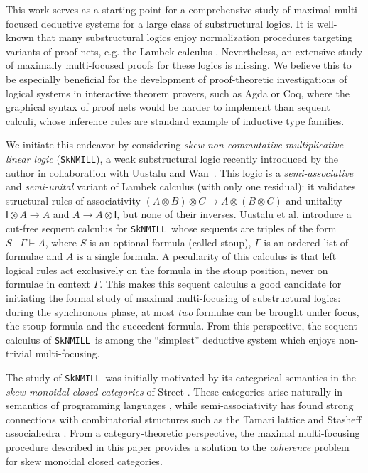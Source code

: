 \documentclass[runningheads]{llncs}
\newcommand{\ot}{\otimes}
\newcommand{\I}{\mathsf{I}}
\newcommand{\SkNMILL}{\texttt{SkNMILL}}
\begin{document}
This work serves as a starting point for a comprehensive study of maximal multi-focused deductive systems for a large class of substructural logics. It is well-known that many substructural logics enjoy normalization procedures targeting variants of proof nets, e.g. the Lambek calculus \cite{LR:pronlc}. Nevertheless, an extensive study of maximally multi-focused proofs for these logics is missing. We believe this to be especially beneficial for the development of proof-theoretic investigations of logical systems in interactive theorem provers, such as Agda or Coq, where  the graphical syntax of proof nets would be harder to implement than sequent calculi, whose inference rules are standard example of inductive type families.

We initiate this endeavor by considering \emph{skew non-commutative multiplicative linear logic} (\SkNMILL), a weak substructural logic recently introduced by the author in collaboration with Uustalu and Wan~\cite{UVW:protsn}. This logic is a \emph{semi-associative} and \emph{semi-unital} variant of Lambek calculus (with only one residual): it validates structural rules of associativity $(A \ot B) \ot C \to A \ot (B \ot C)$ and unitality $\I \ot A \to A$ and $A \to A \ot \I$, but none of their inverses. Uustalu et al. introduce a cut-free sequent calculus for \SkNMILL\ whose sequents are triples of the form $S \mid \Gamma \vdash A$, where $S$ is an optional formula (called stoup), $\Gamma$ is an ordered list of formulae and $A$ is a single formula. A peculiarity of this calculus is that left logical rules act exclusively on the formula in the stoup position, never on formulae in context $\Gamma$. This makes this sequent calculus a good candidate for initiating the formal study of maximal multi-focusing of substructural logics: during the synchronous phase, at most \emph{two} formulae can be brought under focus, the stoup formula and the succedent formula. From this perspective, the sequent calculus of \SkNMILL\ is among the ``simplest'' deductive system which enjoys non-trivial multi-focusing.

The study of \SkNMILL\ was initially motivated by its categorical semantics in the \emph{skew monoidal closed categories} of Street \cite{street:skew-closed:2013}. These categories arise naturally in semantics of programming languages \cite{altenkirch:monads:2014}, while semi-associativity has found strong connections with combinatorial structures such as the Tamari lattice and Stasheff associahedra \cite{zeilberger:semiassociative:19,moortgat:tamari:20}. From a category-theoretic perspective, the maximal multi-focusing procedure described in this paper provides a solution to the \emph{coherence} problem for skew monoidal closed categories.
\end{document}
